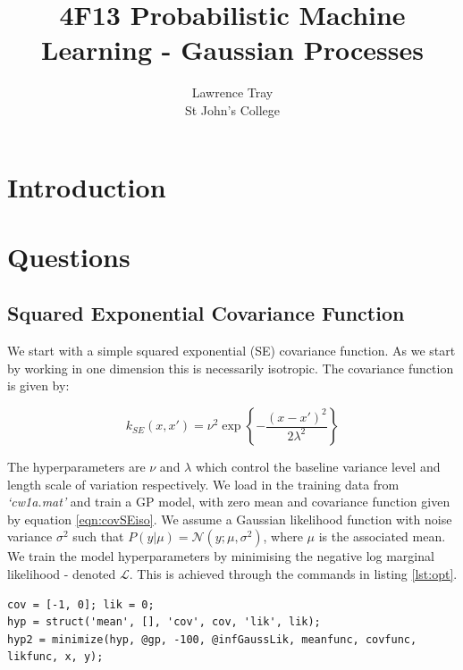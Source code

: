 \documentclass[]{article}
\title{4F13 Probabilistic Machine Learning - Gaussian Processes}
\author{Lawrence Tray \\ St John's College}
\newcommand{\Ncal}{\mathcal{N}}
\newcommand{\Lcal}{\mathcal{L}}
\begin{document}
\maketitle

\begin{abstract}
\end{abstract}

\section{Introduction}

\section{Questions}
\subsection{Squared Exponential Covariance Function}

We start with a simple squared exponential (SE) covariance function. As we start by working in one dimension this is necessarily isotropic. The covariance function is given by:

\begin{equation}
k_{SE}(x, x') = \nu^2 \exp\left\{- \frac{(x-x')^2}{2\lambda^2}\right\}
\label{eqn:covSEiso}
\end{equation}

The hyperparameters are $\nu$ and $\lambda$ which control the baseline variance level and length scale of variation respectively. We load in the training data from \textit{`cw1a.mat'} and train a GP model, with zero mean and covariance function given by equation \ref{eqn:covSEiso}. We assume a Gaussian likelihood function with noise variance $\sigma^2$ such that $P(y|\mu) = \Ncal(y; \mu, \sigma^2)$, where $\mu$ is the associated mean. We train the model hyperparameters by minimising the negative log marginal likelihood - denoted $\Lcal$. This is achieved through the commands in listing \ref{lst:opt}.

\begin{lstlisting}[frame=single, caption={Hyperparameter optimisation}, label={lst:opt}]
cov = [-1, 0]; lik = 0;
hyp = struct('mean', [], 'cov', cov, 'lik', lik);
hyp2 = minimize(hyp, @gp, -100, @infGaussLik, meanfunc, covfunc, likfunc, x, y);
\end{lstlisting}
\end{document}
